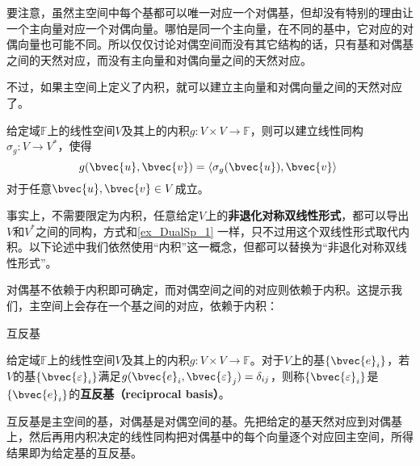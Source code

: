 要注意，虽然主空间中每个基都可以唯一对应一个对偶基，但却没有特别的理由让一个主向量对应一个对偶向量。哪怕是同一个主向量，在不同的基中，它对应的对偶向量也可能不同。所以仅仅讨论对偶空间而没有其它结构的话，只有基和对偶基之间的天然对应，而没有主向量和对偶向量之间的天然对应。



不过，如果主空间上定义了内积，就可以建立主向量和对偶向量之间的天然对应了。



\begin{example}{}\label{ex_DualSp_1}

给定域$\mathbb{F}$上的线性空间$V$及其上的内积$g:V\times V\to \mathbb{F}$，则可以建立线性同构$\sigma_g: V\to V^*$，使得
\begin{equation}
g(\bvec{u}, \bvec{v}) = \langle \sigma_g(\bvec{u}) , \bvec{v} \rangle~
\end{equation}
对于任意$\bvec{u}, \bvec{v}\in V$成立。

\end{example}



事实上，不需要限定为内积，任意给定$V$上的\textbf{非退化对称双线性形式}，都可以导出$V$和$V^*$之间的同构，方式和\autoref{ex_DualSp_1} 一样，只不过用这个双线性形式取代内积。以下论述中我们依然使用“内积”这一概念，但都可以替换为“非退化对称双线性形式”。



对偶基不依赖于内积即可确定，而对偶空间之间的对应则依赖于内积。这提示我们，主空间上会存在一个基之间的对应，依赖于内积：

\begin{definition}{互反基}

给定域$\mathbb{F}$上的线性空间$V$及其上的内积$g:V\times V\to \mathbb{F}$。对于$V$上的基$\{\bvec{e}_i\}$，若$V$的基$\{\bvec{\varepsilon}_i\}$满足$g(\bvec{e}_i, \bvec{\varepsilon}_j)=\delta_{ij}$，则称$\{\bvec{\varepsilon}_i\}$是$\{\bvec{e}_i\}$的\textbf{互反基（reciprocal basis）}。

\end{definition}


互反基是主空间的基，对偶基是对偶空间的基。先把给定的基天然对应到对偶基上，然后再用内积决定的线性同构把对偶基中的每个向量逐个对应回主空间，所得结果即为给定基的互反基。











